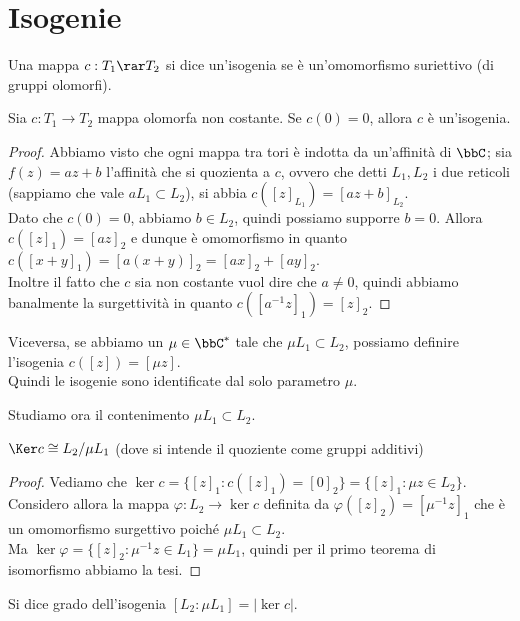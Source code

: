 	\section{Isogenie}
	\begin{definizione}
		Una mappa $c: T_1 \rar T_2$ si dice un'isogenia se è un'omomorfismo suriettivo (di gruppi olomorfi).
	\end{definizione}
    \begin{proposizione}
        Sia $c:T_1\to T_2$ mappa olomorfa non costante. Se $c(0)=0$, allora $c$ è un'isogenia.
    \end{proposizione}
    \begin{proof}
        Abbiamo visto che ogni mappa tra tori è indotta da un'affinità di $\bbC$; sia $f(z)=az+b$ l'affinità che si quozienta a $c$, ovvero che detti $L_1,L_2$ i due reticoli (sappiamo che vale $aL_1\subset L_2$), si abbia $c([z]_{L_1})=[az+b]_{L_2}$.\\
        Dato che $c(0)=0$, abbiamo $b\in L_2$, quindi possiamo supporre $b=0$. Allora $c([z]_1)=[az]_2$ e dunque è omomorfismo in quanto $c([x+y]_1)=[a(x+y)]_2=[ax]_2+[ay]_2$.\\
        Inoltre il fatto che $c$ sia non costante vuol dire che $a\neq0$, quindi abbiamo banalmente la surgettività in quanto $c([a^{-1}z]_1)=[z]_2$.
    \end{proof}
    Viceversa, se abbiamo un $\mu\in\bbC^\ast$ tale che $\mu L_1\subset L_2$, possiamo definire l'isogenia $c([z])=[\mu z]$.\\
    Quindi le isogenie sono identificate dal solo parametro $\mu$.

    Studiamo ora il contenimento $\mu L_1\subset L_2$.

	\begin{proposizione}
		$\Ker c \cong L_2 / \mu L_1$ (dove si intende il quoziente come gruppi additivi)
	\end{proposizione}
	\begin{proof}
		Vediamo che $\ker c=\{[z]_1 : c([z]_1)=[0]_2\} = \{[z]_1 : \mu z\in L_2\}$. Considero allora la mappa $\varphi:L_2\to\ker c$ definita da $\varphi([z]_2)=[\mu^{-1}z]_1$ che è un omomorfismo surgettivo poiché $\mu L_1\subset L_2$.\\
        Ma $\ker\varphi = \{[z]_2 : \mu^{-1} z\in L_1\}=\mu L_1$, quindi per il primo teorema di isomorfismo abbiamo la tesi.
	\end{proof}

	\begin{definizione}
		Si dice grado dell'isogenia $[L_2 : \mu L_1] = |\ker c|$.
    \end{definizione}

